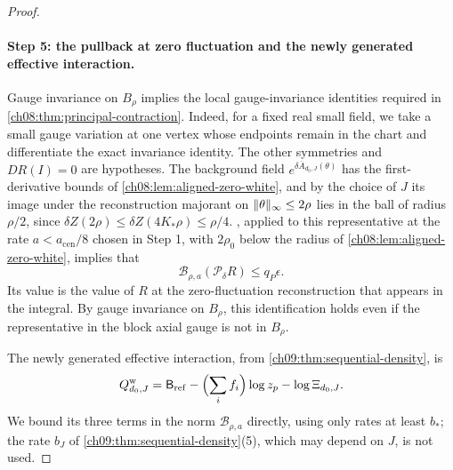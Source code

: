 \begin{proof}
\paragraph{Step 5: the pullback at zero fluctuation and the newly generated effective interaction.}
Gauge invariance on $B_\rho$ implies the local gauge-invariance identities required in \cref{ch08:thm:principal-contraction}. Indeed, for a fixed real small field, we take a small gauge variation at one vertex whose endpoints remain in the chart and differentiate the exact invariance identity. The other symmetries and $DR(I)=0$ are hypotheses. The background field $e^{\delta\overline A_{d_0,J}(\theta)}$ has the first-derivative bounds of \cref{ch08:lem:aligned-zero-white}, and by the choice of $J$ its image under the reconstruction majorant on $\lVert \theta\rVert_\infty\le2\rho$ lies in the ball of radius $\rho/2$, since $\delta Z(2\rho)\le\delta Z(4K_*\rho)\le\rho/4$. , applied to this representative at the rate $a<a_{\mathrm{cen}}/8$ chosen in Step 1, with $2\rho_0$ below the radius of \cref{ch08:lem:aligned-zero-white}, implies that
\[
 \mathcal B_{\rho,a}(\mathcal P_\delta R)\le q_P\epsilon.
\]
Its value is the value of $R$ at the zero-fluctuation reconstruction that appears in the integral. By gauge invariance on $B_\rho$, this identification holds even if the representative in the block axial gauge is not in $B_\rho$.

The newly generated effective interaction, from \cref{ch09:thm:sequential-density}, is
\[
 Q_{d_0,J}^{\mathrm w}=\mathsf B_{\mathrm{ref}}-\Bigl(\sum_if_i\Bigr)\log z_p-\log\Xi_{d_0,J}.
\]
We bound its three terms in the norm $\mathcal B_{\rho,a}$ directly, using only rates at least $b_*$; the rate $b_J$ of \cref{ch09:thm:sequential-density}(5), which may depend on $J$, is not used.


\end{proof}
